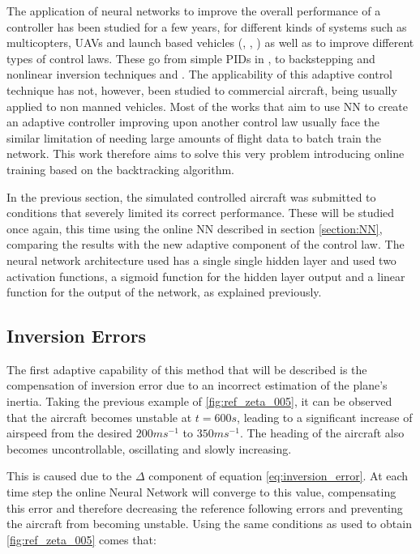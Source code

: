 The application of neural networks to improve the overall performance of a controller has been studied for a few years, for different kinds of systems such as multicopters, UAVs and launch based vehicles (\cite{quad_NLI+NN}, \cite{YANG+LIN_Adaptive_Flight_Control}, \cite{NN_PID2}) as well as to improve different types of control laws. These go from simple PIDs in \cite{NN_PID}, \cite{NN_PID2} to  backstepping and nonlinear inversion techniques \cite{NN_backlash} and \citep{NN_NLI}. The applicability of this adaptive control technique has not, however, been studied to commercial aircraft, being usually applied to non manned vehicles. Most of the works that aim to use NN to create an adaptive controller improving upon another control law usually face the similar limitation of needing large amounts of flight data to batch train the network. This work therefore aims to solve this very problem introducing online training based on the backtracking algorithm. 

In the previous section, the simulated controlled aircraft was submitted to conditions that severely limited its correct performance. These will be studied once again, this time using the online NN described in section \ref{section:NN}, comparing the results with the new adaptive component of the control law. The neural network architecture used has a single single hidden layer and used two activation functions, a sigmoid function for the hidden layer output and a linear function for the output of the network, as explained previously. 


\subsection{Inversion Errors}

The first adaptive capability of this method that will be described is the compensation of inversion error due to an incorrect estimation of the plane's inertia. Taking the previous example of \ref{fig:ref_zeta_005}, it can be observed that the aircraft becomes unstable at $t=600s$, leading to a significant increase of airspeed from the desired $200ms^{-1}$ to $350ms^{-1}$. The heading of the aircraft also becomes uncontrollable, oscillating and slowly increasing. 

This is caused due to the $\Delta$ component of equation \ref{eq:inversion_error}. At each time step the online Neural Network will converge to this value, compensating this error and therefore decreasing the reference following errors and preventing the aircraft from becoming unstable. Using the same conditions as used to obtain \ref{fig:ref_zeta_005} comes that:

